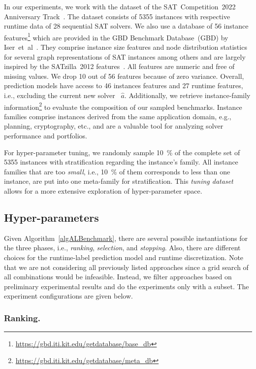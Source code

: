 \documentclass[runningheads]{llncs}
\begin{document}
In our experiments, we work with the dataset of the SAT~Competition~2022 Anniversary Track~\cite{sat2022}.
The dataset consists of 5355 instances with respective runtime data of 28 sequential SAT solvers.
We also use a database of 56 instance features\footnote{\url{https://gbd.iti.kit.edu/getdatabase/base_db}} which are provided in the GBD Benchmark Database~(GBD) by Iser~et~al~\cite{IserS18}.
They comprise instance size features and node distribution statistics for several graph representations of SAT instances among others and are largely inspired by the SATzilla~2012 features~\cite{features}.
All features are numeric and free of missing values.
We drop 10 out of 56 features because of zero variance.
Overall, prediction models have access to 46 instances features and 27 runtime features, i.e., excluding the current new solver~ $\hat{a}$.
Additionally, we retrieve instance-family information\footnote{\url{https://gbd.iti.kit.edu/getdatabase/meta_db}} to evaluate the composition of our sampled benchmarks.
Instance families comprise instances derived from the same application domain, e.g., planning, cryptography, etc., and are a valuable tool for analyzing solver performance and portfolios.

For hyper-parameter tuning, we randomly sample \SI{10}{\%} of the complete set of 5355 instances with stratification regarding the instance's family.
All instance families that are too \emph{small}, i.e., \SI{10}{\%} of them corresponds to less than one instance, are put into one meta-family for stratification.
This \emph{tuning dataset} allows for a more extensive exploration of hyper-parameter space.

\subsection{Hyper-parameters}
\label{sec:exdesign:hyper}

Given Algorithm~\ref{algALBenchmark}, there are several possible instantiations for the three phases, i.e., \emph{ranking}, \emph{selection}, and \emph{stopping}.
Also, there are different choices for the runtime-label prediction model and runtime discretization.
Note that we are not considering all previously listed approaches since a grid search of all combinations would be infeasible.
Instead, we filter approaches based on preliminary experimental results and do the experiments only with a subset.
The experiment configurations are given below.

\subsubsection{Ranking.}
\end{document}
